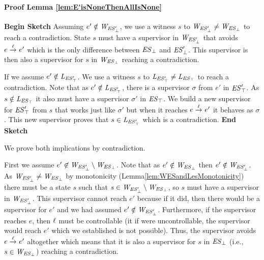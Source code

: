 \paragraph*{Proof Lemma \ref{lem:E'isNoneThenAllIsNone}}
\textbf{Begin Sketch}
Assuming $e' \notin \mathit{W_{\mathit{\mathit{ES}'_{\bot}}}}$, we use a witness $s$ to $\mathit{W_{\mathit{\mathit{ES}'_{\bot}}}} \neq 
\mathit{W_{\mathit{\mathit{ES}_{\bot}}}}$ to reach a contradiction. State $s$ must have a supervisor in 
$\mathit{W_{\mathit{\mathit{ES}'_{\bot}}}}$  that avoids $e \overset{\ell}{\rightarrow}_{} e'$ which is the only difference 
between $\mathit{\mathit{ES}_{\bot}}$ and 
$\mathit{\mathit{ES}'_{\bot}}$. This supervisor is then also a 
supervisor for $s$ in $\mathit{W_{\mathit{\mathit{ES}_{\bot}}}}$ reaching a contradiction. 

If we assume $e' \notin \mathit{L_{\mathit{\mathit{ES}'_{\top}}}}$.  We use a witness $s$ to $\mathit{L_{\mathit{\mathit{ES}'_{\top}}}} 
\neq 
\mathit{L_{\mathit{\mathit{ES}_{\top}}}}$ to reach a contradiction. Note that as $e' \notin \mathit{L_{\mathit{\mathit{ES}'_{\top}}}}$, there 
is a supervisor $\sigma$ from $e'$ in  
$\mathit{\mathit{ES}'_{\top}}$.  As $s \notin \mathit{L_{\mathit{\mathit{ES}_{\top}}}}$ it also must 
have a 
supervisor $\sigma'$ in  $\mathit{\mathit{ES}_{\top}}$. We build 
a 
new supervisor for $\mathit{\mathit{ES}'_{\top}}$ from $s$ that 
works just like $\sigma'$ but when it reaches $e \overset{\ell}{\rightarrow}_{} e'$ it 
behaves as $\sigma$. This new supervisor proves that $s \in \mathit{L_{\mathit{\mathit{ES}'_{\top}}}}$ 
which is a contradiction. 
\textbf{End Sketch}

We prove both implications by contradiction. 

First we assume $e' \not\in 
\mathit{W_{\mathit{\mathit{ES}'_{\bot}}}} \setminus \mathit{W_{\mathit{\mathit{ES}_{\bot}}}}$. Note that as $e' \notin \mathit{W_{\mathit{\mathit{ES}_{\bot}}}}$ then $e' 
\notin 
\mathit{W_{\mathit{\mathit{ES}'_{\bot}}}}$.  As $\mathit{W_{\mathit{\mathit{ES}'_{\bot}}}} \neq \mathit{W_{\mathit{\mathit{ES}_{\bot}}}}$ by monotonicity 
(Lemma\ref{lem:WESandLesMonotonicity}) there must be a state $s$ 
such that $s \in \mathit{W_{\mathit{\mathit{ES}'_{\bot}}}} \setminus 
\mathit{W_{\mathit{\mathit{ES}_{\bot}}}}$, so $s$ must have a supervisor in $\mathit{W_{\mathit{\mathit{ES}'_{\bot}}}} $. This supervisor 
cannot reach $e'$ because if it did, 
then there would be a supervisor for $e'$ and we had assumed $e' 
\notin \mathit{W_{\mathit{\mathit{ES}'_{\bot}}}}$. Furthermore, if the supervisor reaches $e$, then 
$\ell$ 
must be controllable (it if were uncontrollable, the supervisor would 
reach $e'$ which we established is not possible). Thus, the 
supervisor 
avoids $e \overset{\ell}{\rightarrow}_{} e'$ altogether which means that it is also a 
supervisor for $s$ in $\mathit{\mathit{ES}_{\bot}}$ (i.e.,  $s 
\in 
\mathit{W_{\mathit{\mathit{ES}_{\bot}}}}$) reaching a contradiction.


%


